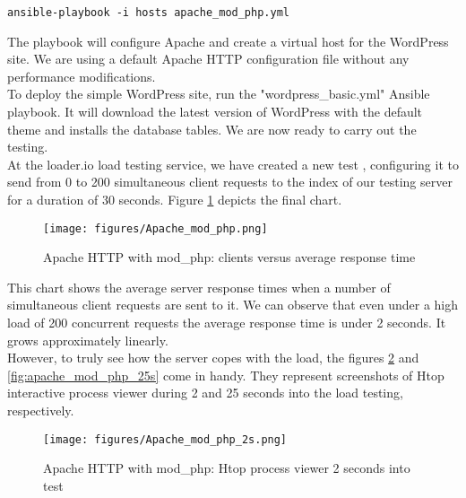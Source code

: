\begin{lstlisting}
ansible-playbook -i hosts apache_mod_php.yml
\end{lstlisting}

The playbook will configure Apache and create a virtual host for the WordPress site. We are using a default Apache HTTP configuration file without any performance modifications. \cite{WP_Ansible:apache.conf}\\

To deploy the simple WordPress site, run the "wordpress\_basic.yml" Ansible playbook. It will download the latest version of WordPress with the default theme and installs the database tables. We are now ready to carry out the testing. \\

At the loader.io load testing service, we have created a new test \cite{Loader.io:apache_mod_php}, configuring it to send from 0 to 200 simultaneous client requests to the index of our testing server for a duration of 30 seconds. Figure \ref{fig:apache_mod_php} depicts the final chart.


\begin{figure}[H]
\begin{center}
\texttt{[image: figures/Apache\_mod\_php.png]}
\caption{Apache HTTP with mod\_php: clients versus average response time}
\label{fig:apache_mod_php}
\end{center}
\end{figure}

This chart shows the average server response times when a number of simultaneous client requests are sent to it. We can observe that even under a high load of 200 concurrent requests the average response time is under 2 seconds. It grows approximately linearly. \\

However, to truly see how the server copes with the load, the figures \ref{fig:apache_mod_php_2s} and \ref{fig:apache_mod_php_25s} come in handy. They represent screenshots of Htop interactive process viewer \cite{Htop:main_site} during 2 and 25 seconds into the load testing, respectively.

\begin{figure}[H]
\begin{center}
\texttt{[image: figures/Apache\_mod\_php\_2s.png]}
\caption{Apache HTTP with mod\_php: Htop process viewer 2 seconds into test}
\label{fig:apache_mod_php_2s}
\end{center}
\end{figure}

